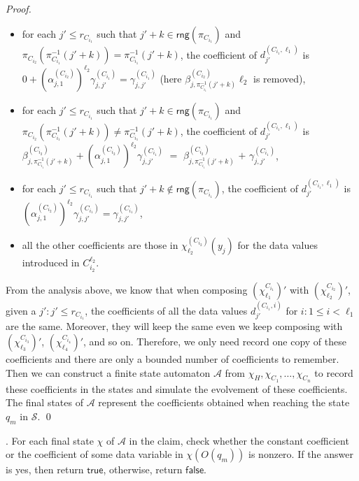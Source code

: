 \documentclass[runningheads,a4paper]{llncs}
\def\Aa{{\mathcal{A} }}
\def\Ss{{\mathcal{S} }}
\newcommand\rng{\mathsf{rng}}
\newcommand\ltrue{\mathsf{true}}
\newcommand\lfalse{\mathsf{false}}
\begin{document}
\begin{proof}
\begin{itemize}
%
\item for each $ j' \le r_{C_{i_1}}$ such that $j'+k \in \rng(\pi_{C_{i_1}})$ and $\pi_{C_{i_2}}(\pi^{-1}_{C_{i_1}}(j'+k))=\pi^{-1}_{C_{i_1}}(j'+k)$, the coefficient of $d^{(C_{i_1},\ell_1)}_{j'}$ is $0 + (\alpha^{(C_{i_2})}_{j,1})^{\ell_2} \gamma^{(C_{i_1})}_{j,j'} = \gamma^{(C_{i_1})}_{j,j'}$ (here $\beta^{(C_{i_2})}_{j, \pi^{-1}_{C_{i_1}}(j'+k)} \ell_2$ is removed),
%
\item for each $ j' \le r_{C_{i_1}}$ such that $j'+k \in \rng(\pi_{C_{i_1}})$ and $\pi_{C_{i_2}}(\pi^{-1}_{C_{i_1}}(j'+k)) \neq \pi^{-1}_{C_{i_1}}(j'+k)$, the coefficient of $d^{(C_{i_1},\ell_1)}_{j'}$ is $\beta^{(C_{i_2})}_{j, \pi^{-1}_{C_{i_1}}(j'+k)} + (\alpha^{(C_{i_2})}_{j,1})^{\ell_2} \gamma^{(C_{i_1})}_{j,j'}$ $=$ $\beta^{(C_{i_2})}_{j, \pi^{-1}_{C_{i_1}}(j'+k)}$ $+$ $\gamma^{(C_{i_1})}_{j,j'}$,
%
\item for each $j' \le r_{C_{i_1}}$ such that $j'+k \not \in \rng(\pi_{C_{i_1}})$, the coefficient of $d^{(C_{i_1},\ell_1)}_{j'}$ is $(\alpha^{(C_{i_2})}_{j,1})^{\ell_2} \gamma^{(C_{i_1})}_{j,j'} = \gamma^{(C_{i_1})}_{j,j'}$,
%
\item all the other coefficients are those in $\chi^{(C_{i_2})}_{\ell_2}(y_j)$ for the data values introduced in $C^{\ell_2}_{i_2}$.
\end{itemize} 
From the analysis above, we know that when composing $(\chi^{C_{i_1}}_{\ell_1})'$ with $(\chi^{C_{i_2}}_{\ell_2})'$, given a $j': j' \le r_{C_{i_1}}$, the coefficients of all the data values $d^{(C_{i_1},i)}_{j'}$ for $i: 1 \le i < \ell_1$ are the same. Moreover, they will keep the same even we keep composing with $(\chi^{C_{i_3}}_{\ell_3})'$, $(\chi^{C_{i_4}}_{\ell_4})'$, and so on. Therefore, we only need record one copy of these coefficients and there are only a bounded number of coefficients to remember. Then we can construct a finite state automaton $\Aa$ from $\chi_H,\chi_{C_1},\dots,\chi_{C_n}$ to record these coefficients in the states and simulate the evolvement of these coefficients. The final states of $\Aa$ represent the coefficients obtained when reaching the state $q_m$ in $\Ss$. \qed
\end{proof}

\medskip 

. For each final state $\chi$ of $\Aa$ in the claim, check whether the constant coefficient or the coefficient of some data variable in $\chi(O(q_m))$ is nonzero. If the answer is yes, then return $\ltrue$, otherwise, return $\lfalse$.
\end{document}
